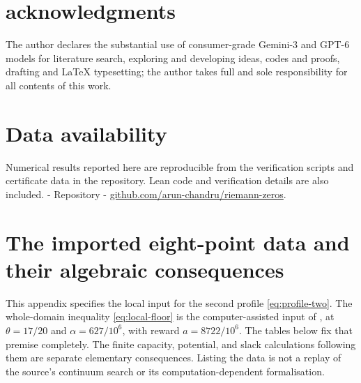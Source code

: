 \documentclass[11pt,reqno]{amsart}
\numberwithin{equation}{section}
\begin{document}
\section*{acknowledgments}
The author declares the substantial use of consumer-grade Gemini-3 and GPT-6 models for literature search, exploring and developing ideas, codes and proofs, drafting and LaTeX typesetting; the author takes full and sole responsibility for all contents of this work.


\section*{Data availability}
Numerical results reported here are reproducible from the verification
scripts and certificate data in the repository. Lean code and verification details are also included. - Repository - 
\href{https://github.com/arun-chandru/riemann-zeros}{github.com/arun-chandru/riemann-zeros}.



\appendix
\section{The imported eight-point data and their algebraic consequences}
\label{app:local-data}

This appendix specifies the local input for the second profile
\eqref{eq:profile-two}. The whole-domain inequality
\eqref{eq:local-floor} is the computer-assisted input of
\cite[Proposition 5.3 and Tables 10--11]{Knausgard2026}, at
$\theta=17/20$ and $\alpha=627/10^6$, with reward $a=8722/10^6$.
The tables below fix that premise completely. The finite capacity,
potential, and slack calculations following them are separate elementary
consequences. Listing the data is not a replay of the source's continuum
search or its computation-dependent formalisation.
\end{document}
